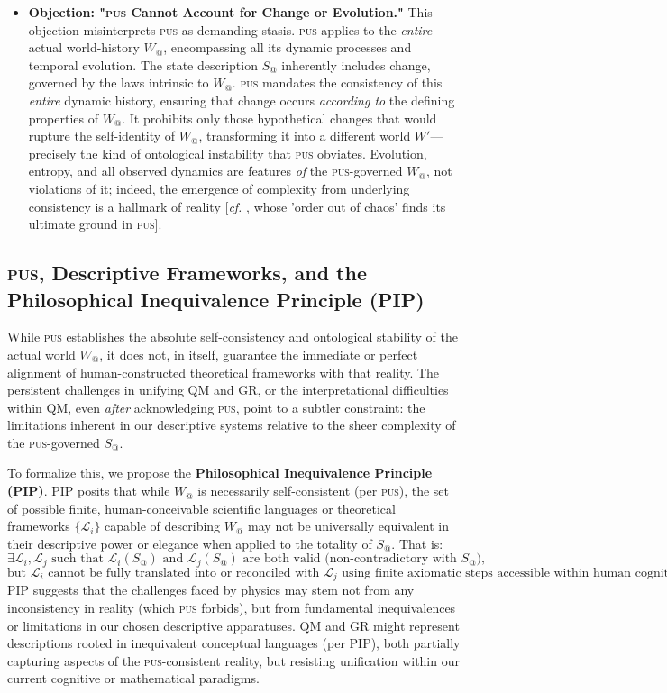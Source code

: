 \documentclass[11pt, a4paper]{article}
\makeatletter
\newcommand{\pus}{\textsc{pus}} %
\newcommand{\Wactual}{W_{@}} %
\newcommand{\Sactual}{S_{@}} %
\newcommand{\LangSet}{\{\mathcal{L}_i\}} %
\makeatother
\begin{document}
\begin{itemize}
    \item \textbf{Objection: "\pus{} Cannot Account for Change or Evolution."} This objection misinterprets \pus{} as demanding stasis. \pus{} applies to the \textit{entire} actual world-history $\Wactual$, encompassing all its dynamic processes and temporal evolution. The state description $\Sactual$ inherently includes change, governed by the laws intrinsic to $\Wactual$. \pus{} mandates the consistency of this \textit{entire} dynamic history, ensuring that change occurs \textit{according to} the defining properties of $\Wactual$. It prohibits only those hypothetical changes that would rupture the self-identity of $\Wactual$, transforming it into a different world $W'$—precisely the kind of ontological instability that \pus{} obviates. Evolution, entropy, and all observed dynamics are features \textit{of} the \pus-governed $\Wactual$, not violations of it; indeed, the emergence of complexity from underlying consistency is a hallmark of reality [\textit{cf.} \citealp{prigogine1984}, whose 'order out of chaos' finds its ultimate ground in \pus{}].
\end{itemize}

\subsection{\pus, Descriptive Frameworks, and the Philosophical Inequivalence Principle (PIP)}
While \pus{} establishes the absolute self-consistency and ontological stability of the actual world $\Wactual$, it does not, in itself, guarantee the immediate or perfect alignment of human-constructed theoretical frameworks with that reality. The persistent challenges in unifying QM and GR, or the interpretational difficulties within QM, even \textit{after} acknowledging \pus, point to a subtler constraint: the limitations inherent in our descriptive systems relative to the sheer complexity of the \pus-governed $\Sactual$.

To formalize this, we propose the \textbf{Philosophical Inequivalence Principle (PIP)}. PIP posits that while $\Wactual$ is necessarily self-consistent (per \pus), the set of possible finite, human-conceivable scientific languages or theoretical frameworks $\LangSet$ capable of describing $\Wactual$ may not be universally equivalent in their descriptive power or elegance when applied to the totality of $\Sactual$. That is:
\[
\exists \mathcal{L}_i, \mathcal{L}_j \text{ such that } \mathcal{L}_i(\Sactual) \text{ and } \mathcal{L}_j(\Sactual) \text{ are both valid (non-contradictory with } \Sactual),
\]
\[
\text{but } \mathcal{L}_i \text{ cannot be fully translated into or reconciled with } \mathcal{L}_j \text{ using finite axiomatic steps accessible within human cognition.}
\]
PIP suggests that the challenges faced by physics may stem not from any inconsistency in reality (which \pus{} forbids), but from fundamental inequivalences or limitations in our chosen descriptive apparatuses. QM and GR might represent descriptions rooted in inequivalent conceptual languages (per PIP), both partially capturing aspects of the \pus-consistent reality, but resisting unification within our current cognitive or mathematical paradigms.
\end{document}
